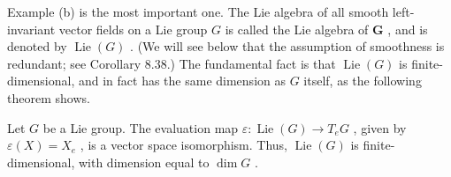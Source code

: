 \begin{definition}
\label{def:8-60-extra-5}
\mathlibok
Example (b) is the most important one. The Lie algebra of all smooth left-invariant vector fields on a Lie group $G$ is called the Lie algebra of $\mathbf{G}$ , and is denoted by $\operatorname{Lie}\left( G\right)$ . (We will see below that the assumption of smoothness is redundant; see Corollary 8.38.) The fundamental fact is that $\operatorname{Lie}\left( G\right)$ is finite-dimensional, and in fact has the same dimension as $G$ itself, as the following theorem shows.
\end{definition}

\begin{theorem}
\label{thm:8-37}
\leanok
{}
Let $G$ be a Lie group. The evaluation map $\varepsilon  : \operatorname{Lie}\left( G\right)  \rightarrow  {T}_{e}G$ , given by $\varepsilon \left( X\right)  = {X}_{e}$ , is a vector space isomorphism. Thus, $\operatorname{Lie}\left( G\right)$ is finite-dimensional, with dimension equal to $\dim G$ .
\end{theorem}

